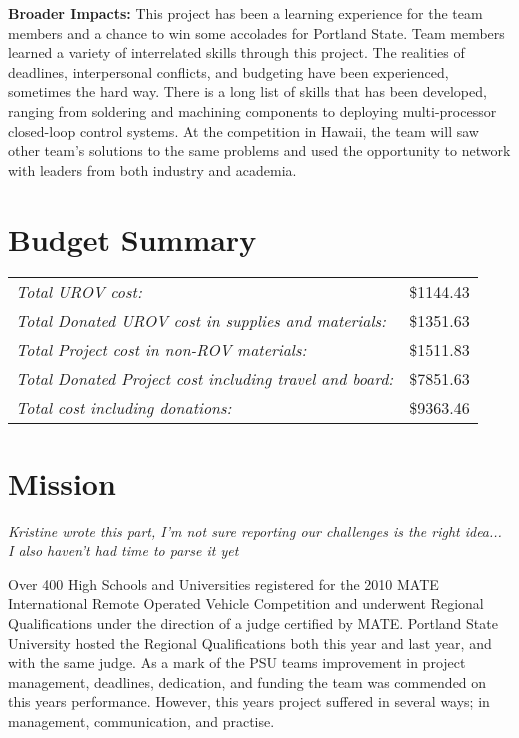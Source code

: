 \documentclass{proposalnsf}
\begin{document}
\noindent
{\bf Broader Impacts:}
This project has been a learning experience for the team members and a chance to win some accolades for Portland State. Team members learned 
a variety of interrelated skills through this project. The realities of deadlines, interpersonal conflicts, and budgeting have been experienced, 
sometimes the hard way. There is a long list of skills that has been developed, ranging from soldering and machining components to deploying 
multi-processor closed-loop control systems. At the competition in Hawaii, the team will saw other team's solutions to the same problems and used the 
opportunity to network with leaders from both industry and academia. 
\renewcommand{\thepage} {B--\arabic{page}}


\section{Budget Summary}
\begin{tabular}[t]{lr}
\it Total UROV cost: &\$1144.43\\
\it Total Donated UROV cost in supplies and materials: &\$1351.63\\
\it Total Project cost in non-ROV materials: &\$1511.83\\
\it Total Donated Project cost including travel and board: &\$7851.63\\\hline
\it Total cost including donations: &\$9363.46\\
\end{tabular}


\noindent
\section{Mission}
 {\it Kristine wrote this part, I'm not sure reporting our challenges is the right idea... I also haven't had time to parse it yet}

Over 400 High Schools and Universities registered for the 2010 MATE International Remote Operated Vehicle Competition and underwent Regional Qualifications under the direction of
a judge certified by MATE.  Portland State University hosted the Regional Qualifications both this year and last year, and with the same judge.  As a mark of the PSU teams improvement
in project management, deadlines, dedication, and funding the team was commended on this years performance.  However, this years project suffered in several ways; in management, communication, and
practise.  
\end{document}
